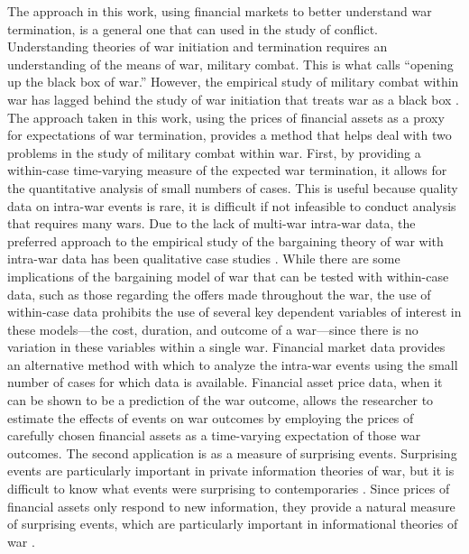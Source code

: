 The approach in this work, using financial markets to better understand war termination, is a general one that can used in the study of conflict.
Understanding theories of war initiation and termination requires an understanding of the means of war, military combat.
This is what \textcite{Gartner1998} calls ``opening up the black box of war.''
However, the empirical study of military combat within war has lagged behind the study of war initiation that treats war as a black box \parencite{Reiter2003}.
The approach taken in this work, using the prices of financial assets as a proxy for expectations of war termination, provides a method that helps deal with two problems in the study of military combat within war.
First, by providing a within-case time-varying measure of the expected war termination, it allows for the quantitative analysis of small numbers of cases.
This is useful because quality data on intra-war events is rare, it is difficult if not infeasible to conduct analysis that requires many wars.
Due to the lack of multi-war intra-war data, the preferred approach to the empirical study of the bargaining theory of war with intra-war data has been qualitative case studies \parencites{Reiter2003}[][Chapter 9]{Reiter2009}. 
While there are some implications of the bargaining model of war that can be tested with within-case data, such as those regarding the offers made throughout the war, the use of within-case data prohibits the use of several key dependent variables of interest in these models---the cost, duration, and outcome of a war---since there is no variation in these variables within a single war.
Financial market data provides an alternative method with which to analyze the intra-war events using the small number of cases for which data is available.
Financial asset price data, when it can be shown to be a prediction of the war outcome, allows the researcher to estimate the effects of events on war outcomes by employing the prices of carefully chosen financial assets as a time-varying expectation of those war outcomes.
The second application is as a measure of surprising events.
Surprising events are particularly important in private information theories of war, but it is difficult to know what events were surprising to contemporaries \parencite{Shirkey2009a}.
Since prices of financial assets only respond to new information, they provide a natural measure of surprising events, which are particularly important in informational theories of war \parencite{Shirkey2009a}.

